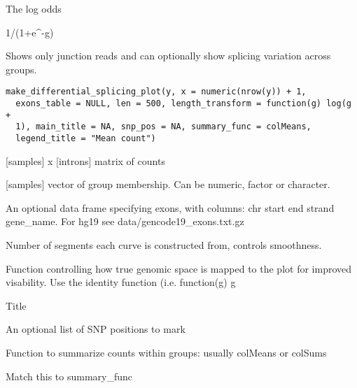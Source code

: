 \documentclass[a4paper]{book}
\begin{document}
%
\begin{Arguments}
\begin{ldescription}
\item[\code{g}] The log odds
\end{ldescription}
\end{Arguments}
%
\begin{Value}
1/(1+e\textasciicircum{}-g)
\end{Value}
%
\begin{Description}\relax
Shows only junction reads and can optionally show splicing variation across groups.
\end{Description}
%
\begin{Usage}
\begin{verbatim}
make_differential_splicing_plot(y, x = numeric(nrow(y)) + 1,
  exons_table = NULL, len = 500, length_transform = function(g) log(g +
  1), main_title = NA, snp_pos = NA, summary_func = colMeans,
  legend_title = "Mean count")
\end{verbatim}
\end{Usage}
%
\begin{Arguments}
\begin{ldescription}
\item[\code{y}] [samples] x [introns] matrix of counts

\item[\code{x}] [samples] vector of group membership. Can be numeric, factor or character.

\item[\code{exons\_table}] An optional data frame specifying exons, with columns: chr start end strand gene\_name. For hg19 see data/gencode19\_exons.txt.gz

\item[\code{len}] Number of segments each curve is constructed from, controls smoothness.

\item[\code{length\_transform}] Function controlling how true genomic space is mapped to the plot for improved visability. Use the identity function (i.e. function(g) g

\item[\code{main\_title}] Title

\item[\code{snp\_pos}] An optional list of SNP positions to mark

\item[\code{summary\_func}] Function to summarize counts within groups: usually colMeans or colSums

\item[\code{legend\_title}] Match this to summary\_func
\end{ldescription}
\end{Arguments}
\end{document}
